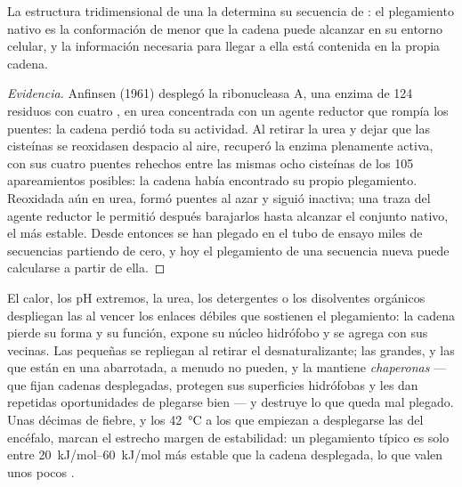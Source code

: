 \begin{theorem}\label{thm:b1:proteins:anfinsen}
La estructura tridimensional de una  la determina su secuencia de
: el plegamiento nativo es la conformación de menor 
que la cadena puede alcanzar en su entorno celular, y la información
necesaria para llegar a ella está contenida en la propia cadena.
\end{theorem}
\begin{proof}[Evidencia]
Anfinsen (1961) desplegó la ribonucleasa A, una enzima de \qty{124}{}
residuos con cuatro , en urea concentrada con un agente
reductor que rompía los puentes: la cadena perdió toda su actividad. Al
retirar la urea y dejar que las cisteínas se reoxidasen despacio al aire,
recuperó la enzima plenamente activa, con sus cuatro puentes rehechos entre
las mismas ocho cisteínas de los \qty{105}{} apareamientos posibles: la
cadena había encontrado su propio plegamiento. Reoxidada aún en urea, formó
puentes al azar y siguió inactiva; una traza del agente reductor le permitió
después barajarlos hasta alcanzar el conjunto nativo, el más estable. Desde
entonces se han plegado en el tubo de ensayo miles de secuencias partiendo
de cero, y hoy el plegamiento de una secuencia nueva puede calcularse a
partir de ella.
\end{proof}

\begin{proposition}[Desnaturalización]\label{prop:b1:proteins:denaturation}
El calor, los pH extremos, la urea, los detergentes o los disolventes
orgánicos despliegan las  al vencer los enlaces débiles que
sostienen el plegamiento: la cadena pierde su forma y su función, expone su
núcleo hidrófobo y se agrega con sus vecinas. Las  pequeñas se
repliegan al retirar el desnaturalizante; las grandes, y las que están en
una  abarrotada, a menudo no pueden, y la  mantiene
\emph{chaperonas} ---  que fijan cadenas
desplegadas, protegen sus superficies hidrófobas y les dan repetidas
oportunidades de plegarse bien --- y destruye lo que queda mal plegado. Unas
décimas de fiebre, y los \qty{42}{\celsius} a los que empiezan a desplegarse
las  del encéfalo, marcan el estrecho margen de estabilidad: un
plegamiento típico es solo entre \qtyrange{20}{60}{kJ/mol} más estable que
la cadena desplegada, lo que valen unos pocos .
\end{proposition}

